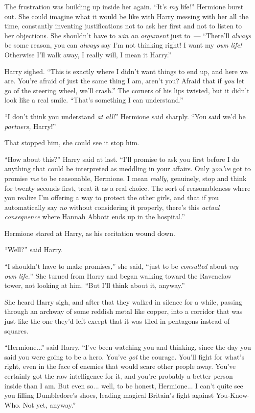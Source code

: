 The frustration was building up inside her again. ``It's \emph{my} life!'' Hermione burst out. She could imagine what it would be like with Harry messing with her all the time, constantly inventing justifications not to ask her first and not to listen to her objections. She shouldn't have to \emph{win an argument} just to~--- ``There'll \emph{always} be some reason, you can \emph{always} say I'm not thinking right! I want my \emph{own life!} Otherwise I'll walk away, I really will, I mean it Harry.''

Harry sighed. ``This is exactly where I didn't want things to end up, and here we are. You're afraid of just the same thing I am, aren't you? Afraid that if \emph{you} let go of the steering wheel, we'll crash.'' The corners of his lips twisted, but it didn't look like a real smile. ``That's something I can understand.''

``I don't think you understand \emph{at all!}'' Hermione said sharply. ``You said we'd be \emph{partners,} Harry!''

That stopped him, she could see it stop him.

``How about this?'' Harry said at last. ``I'll promise to ask you first before I do anything that could be interpreted as meddling in your affairs. Only \emph{you've} got to promise \emph{me} to be reasonable, Hermione. I mean \emph{really}, genuinely, stop and think for twenty seconds first, treat it as a real choice. The sort of reasonableness where you realize I'm offering a way to protect the other girls, and that if you automatically say \emph{no} without considering it properly, there's this \emph{actual consequence} where Hannah Abbott ends up in the hospital.''

Hermione stared at Harry, as his recitation wound down.

``Well?'' said Harry.

``I shouldn't have to make promises,'' she said, ``just to be \emph{consulted} about \emph{my own life.}'' She turned from Harry and began walking toward the Ravenclaw tower, not looking at him. ``But I'll think about it, anyway.''

She heard Harry sigh, and after that they walked in silence for a while, passing through an archway of some reddish metal like copper, into a corridor that was just like the one they'd left except that it was tiled in pentagons instead of squares.

``Hermione...'' said Harry. ``I've been watching you and thinking, since the day you said you were going to be a hero. You've \emph{got} the courage. You'll fight for what's right, even in the face of enemies that would scare other people away. You've certainly got the raw intelligence for it, and you're probably a better person inside than I am. But even so... well, to be honest, Hermione... I can't quite see you filling Dumbledore's shoes, leading magical Britain's fight against You-Know-Who. Not yet, anyway.''

